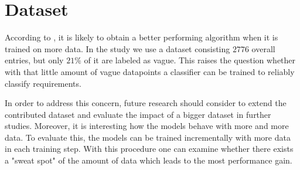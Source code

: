 \section{Dataset}
\label{chp:future_work:sec:dataset}
According to \textcite{Domingos:2012}, it is likely to obtain a better performing algorithm when it is trained on more data.
In the study we use a dataset consisting $2776$ overall entries, but only $21\%$ of it are labeled as vague.
This raises the question whether with that little amount of vague datapoints a classifier can be trained to reliably classify requirements.

In order to address this concern, future research should consider to extend the contributed dataset and evaluate the impact of a bigger dataset in further studies.
Moreover, it is interesting how the models behave with more and more data.
To evaluate this, the models can be trained incrementally with more data in each training step.
With this procedure one can examine whether there exists a "sweat spot" of the amount of data which leads to the most performance gain.
